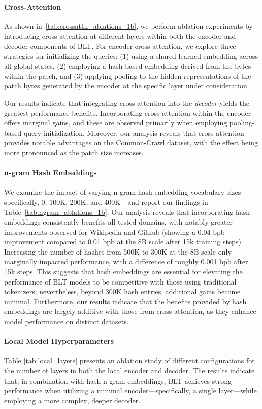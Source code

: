 \paragraph{Cross-Attention} 
As shown in~\autoref{tab:crossattn_ablations_1b}, we perform ablation experiments by introducing cross-attention at different layers within both the encoder and decoder components of {\textsc BLT}. For encoder cross-attention, we explore three strategies for initializing the queries: (1) using a shared learned embedding across all global states, (2) employing a hash-based embedding derived from the bytes within the patch, and (3) applying pooling to the hidden representations of the patch bytes generated by the encoder at the specific layer under consideration.

Our results indicate that integrating cross-attention into the \textit{decoder} yields the greatest performance benefits. Incorporating cross-attention within the encoder offers marginal gains, and these are observed primarily when employing pooling-based query initialization. Moreover, our analysis reveals that cross-attention provides notable advantages on the Common-Crawl dataset, with the effect being more pronounced as the patch size increases.

\paragraph{n-gram Hash Embeddings} 

We examine the impact of varying n-gram hash embedding vocabulary sizes—specifically, 0, 100K, 200K, and 400K—and report our findings in Table~\ref{tab:ngram_ablations_1b}. Our analysis reveals that incorporating hash embeddings consistently benefits all tested domains, with notably greater improvements observed for Wikipedia and Github (showing a 0.04 bpb improvement compared to 0.01 bpb at the 8B scale after 15k training steps). Increasing the number of hashes from 500K to 300K at the 8B scale only marginally impacted performance, with a difference of roughly 0.001 bpb after 15k steps. This suggests that hash embeddings are essential for elevating the performance of {\textsc BLT} models to be competitive with those using traditional tokenizers; nevertheless, beyond 300K hash entries, additional gains become minimal. Furthermore, our results indicate that the benefits provided by hash embeddings are largely additive with those from cross-attention, as they enhance model performance on distinct datasets.

\paragraph{Local Model Hyperparameters} Table \ref{tab:local_layers} presents an ablation study of different configurations for the number of layers in both the local encoder and decoder. The results indicate that, in combination with hash n-gram embeddings, {\textsc BLT} achieves strong performance when utilizing a minimal encoder—specifically, a single layer—while employing a more complex, deeper decoder.

